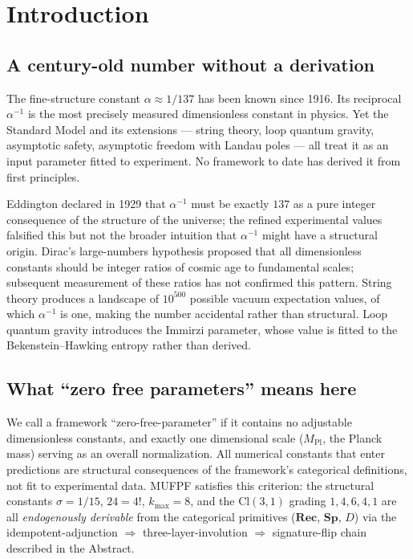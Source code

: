 \documentclass[11pt,twoside]{article}
\newcommand{\rec}{\mathbf{Rec}}
\newcommand{\spc}{\mathbf{Sp}}
\newcommand{\DF}{\ensuremath{D}}
\begin{document}
\section{Introduction}
\label{sec:intro}

\subsection{A century-old number without a derivation}
The fine-structure constant $\alpha \approx 1/137$ has been known since 1916. Its reciprocal $\alpha^{-1}$ is the most precisely measured dimensionless constant in physics. Yet the Standard Model and its extensions — string theory, loop quantum gravity, asymptotic safety, asymptotic freedom with Landau poles — all treat it as an input parameter fitted to experiment. No framework to date has derived it from first principles.

Eddington declared in 1929 that $\alpha^{-1}$ must be exactly $137$ as a pure integer consequence of the structure of the universe; the refined experimental values falsified this but not the broader intuition that $\alpha^{-1}$ might have a structural origin. Dirac's large-numbers hypothesis proposed that all dimensionless constants should be integer ratios of cosmic age to fundamental scales; subsequent measurement of these ratios has not confirmed this pattern. String theory produces a landscape of $10^{500}$ possible vacuum expectation values, of which $\alpha^{-1}$ is one, making the number accidental rather than structural. Loop quantum gravity introduces the Immirzi parameter, whose value is fitted to the Bekenstein--Hawking entropy rather than derived.

\subsection{What ``zero free parameters'' means here}
We call a framework ``zero-free-parameter'' if it contains no adjustable dimensionless constants, and exactly one dimensional scale ($M_{\mathrm{Pl}}$, the Planck mass) serving as an overall normalization. All numerical constants that enter predictions are structural consequences of the framework's categorical definitions, not fit to experimental data. MUFPF satisfies this criterion: the structural constants $\sigma = 1/15$, $24 = 4!$, $k_{\max} = 8$, and the $\mathrm{Cl}(3,1)$ grading $1,4,6,4,1$ are all \emph{endogenously derivable} from the categorical primitives ($\rec$, $\spc$, $\DF$) via the idempotent-adjunction $\Rightarrow$ three-layer-involution $\Rightarrow$ signature-flip chain described in the Abstract.
\end{document}
